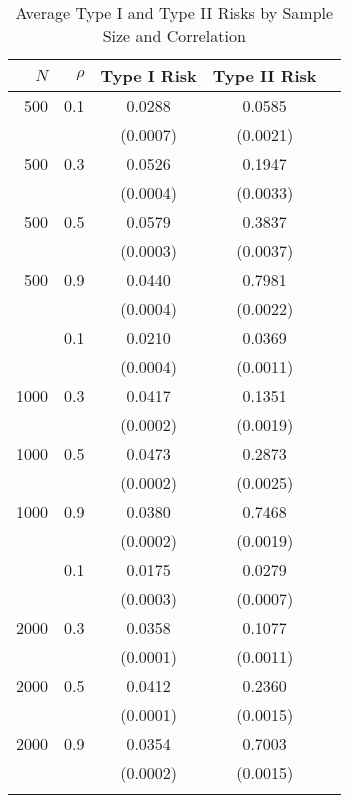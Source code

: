 \begin{table}
\caption{Average Type I and Type II Risks by Sample Size and Correlation}
\centering
\begin{tabular}{rrccc}
\toprule
$N$ & $\rho$ & \multicolumn{1}{c}{Type I Risk} & \multicolumn{1}{c}{Type II Risk} \\
\midrule
500 & 0.1 & 0.0288 & 0.0585 \\
& & (0.0007) & (0.0021) \\
500 & 0.3 & 0.0526 & 0.1947 \\
& & (0.0004) & (0.0033) \\
500 & 0.5 & 0.0579 & 0.3837 \\
& & (0.0003) & (0.0037) \\
500 & 0.9 & 0.0440 & 0.7981 \\
& & (0.0004) & (0.0022) \\
\addlinespace
1000 & 0.1 & 0.0210 & 0.0369 \\
& & (0.0004) & (0.0011) \\
1000 & 0.3 & 0.0417 & 0.1351 \\
& & (0.0002) & (0.0019) \\
1000 & 0.5 & 0.0473 & 0.2873 \\
& & (0.0002) & (0.0025) \\
1000 & 0.9 & 0.0380 & 0.7468 \\
& & (0.0002) & (0.0019) \\
\addlinespace
2000 & 0.1 & 0.0175 & 0.0279 \\
& & (0.0003) & (0.0007) \\
2000 & 0.3 & 0.0358 & 0.1077 \\
& & (0.0001) & (0.0011) \\
2000 & 0.5 & 0.0412 & 0.2360 \\
& & (0.0001) & (0.0015) \\
2000 & 0.9 & 0.0354 & 0.7003 \\
& & (0.0002) & (0.0015) \\
\addlinespace
\bottomrule
\end{tabular}
\end{table}
